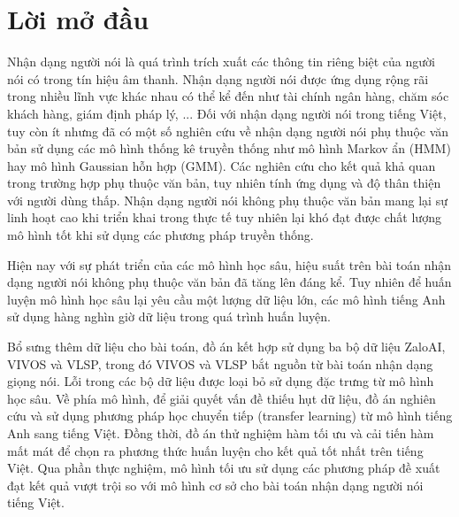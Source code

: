 \documentclass[a4paper, 13pt, oneside]{report}
\begin{document}
\chapter*{Lời mở đầu}
Nhận dạng người nói là quá trình trích xuất các thông tin riêng biệt của người nói có trong tín hiệu âm thanh. Nhận dạng người nói được ứng dụng rộng rãi trong nhiều lĩnh vực khác nhau có thể kể đến như tài chính ngân hàng, chăm sóc khách hàng, giám định pháp lý, ... Đối với nhận dạng người nói trong tiếng Việt, tuy còn ít nhưng đã có một số nghiên cứu về nhận dạng người nói phụ thuộc văn bản sử dụng các mô hình thống kê truyền thống như mô hình Markov ẩn (HMM) hay mô hình Gaussian hỗn hợp (GMM). Các nghiên cứu cho kết quả khả quan trong trường hợp phụ thuộc văn bản, tuy nhiên tính ứng dụng và độ thân thiện với người dùng thấp. Nhận dạng người nói không phụ thuộc văn bản mang lại sự linh hoạt cao khi triển khai trong thực tế tuy nhiên lại khó đạt được chất lượng mô hình tốt khi sử dụng các phương pháp truyền thống. 

Hiện nay với sự phát triển của các mô hình học sâu, hiệu suất trên bài toán nhận dạng người nói không phụ thuộc văn bản đã tăng lên đáng kể. Tuy nhiên để huấn luyện mô hình học sâu lại yêu cầu một lượng dữ liệu lớn, các mô hình tiếng Anh sử dụng hàng nghìn giờ dữ liệu trong quá trình huấn luyện.

Bổ sưng thêm dữ liệu cho bài toán, đồ án kết hợp sử dụng ba bộ dữ liệu ZaloAI, VIVOS và VLSP, trong đó VIVOS và VLSP bắt nguồn từ bài toán nhận dạng giọng nói. Lỗi trong các bộ dữ liệu được loại bỏ sử dụng đặc trưng từ mô hình học sâu. Về phía mô hình, để giải quyết vấn đề thiếu hụt dữ liệu, đồ án nghiên cứu và sử dụng phương pháp học chuyển tiếp (transfer learning) từ mô hình tiếng Anh sang tiếng Việt. Đồng thời, đồ án thử nghiệm hàm tối ưu và cải tiến hàm mất mát để chọn ra phương thức huấn luyện cho kết quả tốt nhất trên tiếng Việt. Qua phần thực nghiệm, mô hình tối ưu sử dụng các phương pháp đề xuất đạt kết quả vượt trội so với mô hình cơ sở cho bài toán nhận dạng người nói tiếng Việt.

\setcounter{page}{1}
\tableofcontents
\pagebreak
{}
\listoffigures
\listoftables

\printglossary[type=\acronymtype,style=long, title=List of Abbreviations]
\printglossary
\pagebreak
\end{document}
